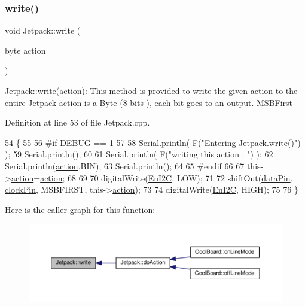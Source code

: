 \subsubsection{\texorpdfstring{write()}{write()}}
{\footnotesize\ttfamily void Jetpack\+::write (\begin{DoxyParamCaption}\item[{byte}]{action }\end{DoxyParamCaption})}

Jetpack\+::write(action)\+: This method is provided to write the given action to the entire \hyperlink{class_jetpack}{Jetpack} action is a Byte (8 bits ), each bit goes to an output. M\+S\+B\+First 

Definition at line 53 of file Jetpack.\+cpp.


\begin{DoxyCode}
54 \{
55 
56 \textcolor{preprocessor}{#if DEBUG == 1}
57 
58     Serial.println( F(\textcolor{stringliteral}{"Entering Jetpack.write()"}) );
59     Serial.println();
60 
61     Serial.println( F(\textcolor{stringliteral}{"writing this action : "}) );
62     Serial.println(\hyperlink{class_jetpack_aca3142925a7b0834b34ae91d26af7765}{action},BIN);
63     Serial.println();
64 
65 \textcolor{preprocessor}{#endif }
66 
67     this->\hyperlink{class_jetpack_aca3142925a7b0834b34ae91d26af7765}{action}=\hyperlink{class_jetpack_aca3142925a7b0834b34ae91d26af7765}{action};
68 
69     
70     digitalWrite(\hyperlink{class_jetpack_a81df984fb4cea98c71aa1a1cfcdfe814}{EnI2C}, LOW);
71     
72     shiftOut(\hyperlink{class_jetpack_a3d669a56e93c71dd25f970d4ed7d0c00}{dataPin}, \hyperlink{class_jetpack_a58ebb991f358f3ae94e82148b0221b5a}{clockPin}, MSBFIRST, this->\hyperlink{class_jetpack_aca3142925a7b0834b34ae91d26af7765}{action});
73 
74     digitalWrite(\hyperlink{class_jetpack_a81df984fb4cea98c71aa1a1cfcdfe814}{EnI2C}, HIGH);
75 
76 \}   
\end{DoxyCode}
Here is the caller graph for this function\+:\nopagebreak
\begin{figure}[H]
\begin{center}
\leavevmode
\includegraphics[width=350pt]{df/d1d/class_jetpack_a338f1af8cbc6504ac69b47c7328569b5_icgraph}
\end{center}
\end{figure}
\mbox{\label{class_jetpack_a79ae7bc3c1828a0551a7c005c4f8bd00}} 
